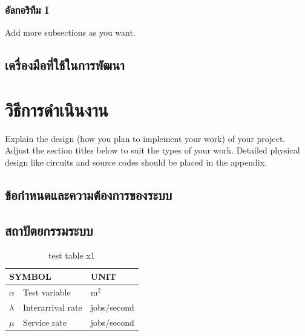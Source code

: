 \documentclass[12pt,oneside,openright,a4paper]{cpe-thai-project}
\begin{document}
 
\subsection{อัลกอริทึม I}
Add more subsections as you want.


\section{เครื่องมือที่ใช้ในการพัฒนา}

\chapter{วิธีการดำเนินงาน}

Explain the design (how you plan to implement your work) of your project. Adjust the section titles below to suit the types of your work. Detailed physical design like circuits and source codes should be placed in the appendix.

\section{ข้อกำหนดและความต้องการของระบบ}

\section{สถาปัตยกรรมระบบ}

\begin{table}[!h]
\centering
\caption{test table x1}\label{tbl:symbols}
\begin{tabular}{@{}p{}|p{}p{}}\hline
\multicolumn{2}{l}{\textbf{SYMBOL}}  & \textbf{UNIT} \\ \hline 
$\alpha$ & Test variable\hfill & m$^2$ \\
$\lambda$ & Interarrival rate\hfill &  jobs/second\\
$\mu$ & Service rate\hfill & jobs/second \\ \hline
\end{tabular}
\end{table}
\end{document}
